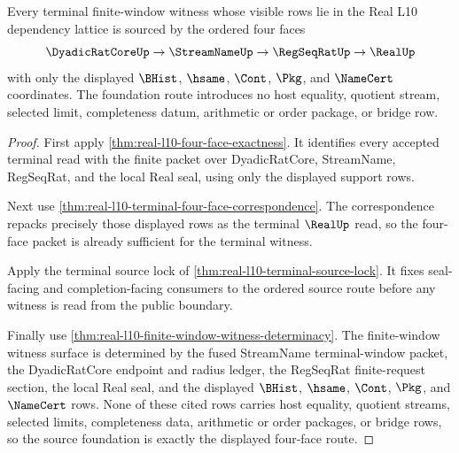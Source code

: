 \begin{lemma}
\label{thm:real-l10-source-route-foundation}
Every terminal finite-window witness whose visible rows lie in the Real L10 dependency lattice is sourced by the ordered four faces
$$
\DyadicRatCoreUp \to \StreamNameUp \to \RegSeqRatUp \to \RealUp
$$
with only the displayed $\BHist$, $\hsame$, $\Cont$, $\Pkg$, and $\NameCert$ coordinates. The foundation route introduces no host equality, quotient stream, selected limit, completeness datum, arithmetic or order package, or bridge row.
\end{lemma}
\begin{proof}
First apply \autoref{thm:real-l10-four-face-exactness}. It identifies every accepted terminal read with the finite packet over DyadicRatCore, StreamName, RegSeqRat, and the local Real seal, using only the displayed support rows.

Next use \autoref{thm:real-l10-terminal-four-face-correspondence}. The correspondence repacks precisely those displayed rows as the terminal $\RealUp$ read, so the four-face packet is already sufficient for the terminal witness.

Apply the terminal source lock of \autoref{thm:real-l10-terminal-source-lock}. It fixes seal-facing and completion-facing consumers to the ordered source route before any witness is read from the public boundary.

Finally use \autoref{thm:real-l10-finite-window-witness-determinacy}. The finite-window witness surface is determined by the fused StreamName terminal-window packet, the DyadicRatCore endpoint and radius ledger, the RegSeqRat finite-request section, the local Real seal, and the displayed $\BHist$, $\hsame$, $\Cont$, $\Pkg$, and $\NameCert$ rows. None of these cited rows carries host equality, quotient streams, selected limits, completeness data, arithmetic or order packages, or bridge rows, so the source foundation is exactly the displayed four-face route.
\end{proof}

